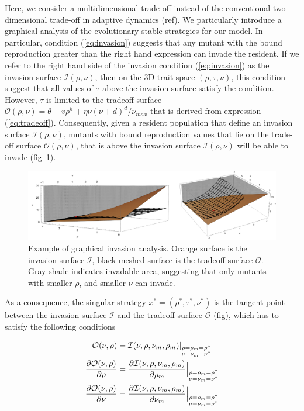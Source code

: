 \documentclass[11pt]{article}
\begin{document}
Here, we consider a multidimensional trade-off instead of the conventional two dimensional trade-off in adaptive dynamics (ref). We particularly introduce a graphical analysis of the evolutionary stable strategies for our model. In particular, condition (\ref{eq:invasion}) suggests that any mutant with the bound reproduction greater than the right hand expression can invade the resident. If we refer to the right hand side of the invasion condition (\ref{eq:invasion}) as the invasion surface $\mathcal{I}(\rho, \nu)$, then on the 3D trait space $(\rho, \tau, \nu)$, this condition suggest that all values of $\tau$ above the invasion surface satisfy the condition. However, $\tau$ is limited to the tradeoff surface $\mathcal{O}(\rho, \nu) = \theta - v \rho^h + \eta \nu (\nu + d )^d/\nu_{max}$ that is derived from expression (\ref{eq:tradeoff}). Consequently, given a resident population that define an invasion surface $\mathcal{I}(\rho, \nu)$, mutants with bound reproduction values that lie on the trade-off surface $\mathcal{O}(\rho, \nu)$, that is above the invasion surface $\mathcal{I}(\rho, \nu)$ will be able to invade (fig~\ref{Fig:invasion_eg}).

\begin{figure}[ht!]
	\centering
	\includegraphics[width= \linewidth]{Figures/mainfig_invasion_eg}
	\caption{Example of graphical invasion analysis. Orange surface is the invasion surface $\mathcal{I}$, black meshed surface is the tradeoff surface $\mathcal{O}$. Gray shade indicates invadable area, suggesting that only mutants with smaller $\rho$, and smaller $\nu$ can invade.}
	\label{Fig:invasion_eg}
\end{figure}

As a consequence, the singular strategy $x^* = (\rho^*, \tau^*, \nu^*)$ is the tangent point between the invasion surface $\mathcal{I}$ and the tradeoff surface $\mathcal{O}$ (fig), which has to satisfy the following conditions

\begin{align}
		\label{eq:singular_cond}
	\mathcal{O}(\nu, \rho) &  = 
	\mathcal{I}(\nu, \rho, \nu_m, \rho_m) |_{\substack{\rho = \rho_m = \rho^*   \\
			\nu = \nu_m = \nu^*}} \notag
	\\
	\frac{\partial \mathcal{O}(\nu, \rho)}{\partial \rho} & = 
	\frac{\partial  \mathcal{I}(\nu, \rho, \nu_m, \rho_m) }{\partial \rho_m}
	\Big|_{\substack{\rho = \rho_m = \rho^* \\
			\nu = \nu_m = \nu^*}} 
	\\
	\frac{\partial \mathcal{O}(\nu, \rho) }{\partial \nu} & = 
	\frac{\partial  \mathcal{I}(\nu, \rho, \nu_m, \rho_m) }{\partial \nu_m} 
	\Big|_{\substack{\rho = \rho_m = \rho^* \\
			\nu = \nu_m = \nu^*}} \notag
\end{align}
\end{document}
